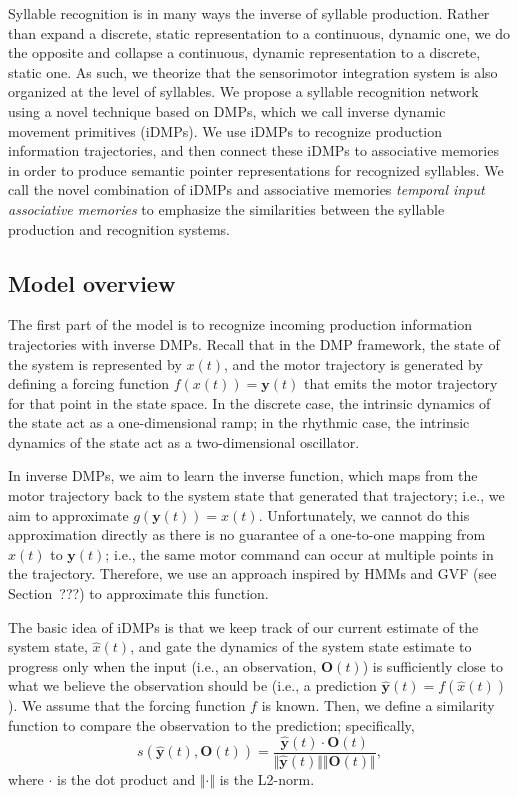 Syllable recognition is in many ways
the inverse of syllable production.
Rather than expand a discrete, static representation
to a continuous, dynamic one,
we do the opposite and collapse
a continuous, dynamic representation
to a discrete, static one.
As such, we theorize that the sensorimotor integration system
is also organized at the level of syllables.
We propose a syllable recognition network
using a novel technique based on DMPs,
which we call
inverse dynamic movement primitives
(iDMPs).
We use iDMPs to recognize production information trajectories,
and then connect these iDMPs
to associative memories
in order to produce semantic pointer representations
for recognized syllables.
We call the novel combination of
iDMPs and associative memories
\textit{temporal input associative memories}
to emphasize the similarities
between the syllable production
and recognition systems.

\subsection{Model overview}

The first part of the model is to
recognize incoming production information trajectories
with inverse DMPs.
Recall that in the DMP framework,
the state of the system
is represented by $x(t)$,
and the motor trajectory
is generated by defining
a forcing function $f(x(t)) = \mathbf{y}(t)$
that emits the motor trajectory
for that point in the state space.
In the discrete case,
the intrinsic dynamics
of the state act
as a one-dimensional ramp;
in the rhythmic case,
the intrinsic dynamics
of the state act
as a two-dimensional oscillator.

In inverse DMPs, we aim to learn the inverse function,
which maps from the motor trajectory
back to the system state that generated that
trajectory; i.e., we aim to approximate
$g(\mathbf{y}(t)) = x(t)$.
Unfortunately, we cannot do this approximation directly
as there is no guarantee of a one-to-one mapping
from $x(t)$ to $\mathbf{y}(t)$;
i.e., the same motor command can occur
at multiple points in the trajectory.
Therefore, we use an approach
inspired by HMMs and GVF
(see Section~???)
to approximate this function.

The basic idea of iDMPs
is that we keep track of our
current estimate of the system state,
$\hat{x}(t)$,
and gate the dynamics
of the system state estimate
to progress only when the input
(i.e., an observation, $\mathbf{O}(t)$)
is sufficiently close to what we believe
the observation should be
(i.e., a prediction $\hat{\mathbf{y}}(t) = f(\hat{x}(t))$).
We assume that the
forcing function $f$ is known.
Then, we define a similarity function
to compare the observation to
the prediction; specifically,
\begin{equation}
  \label{imdp-similarity}
  s(\hat{\mathbf{y}}(t), \mathbf{O}(t)) =
    \frac{\hat{\mathbf{y}}(t) \cdot \mathbf{O}(t)}
    {\Vert\hat{\mathbf{y}}(t)\Vert \Vert\mathbf{O}(t)\Vert},
\end{equation}
where $\cdot$ is the dot product
and $\Vert\cdot\Vert$ is the L2-norm.

